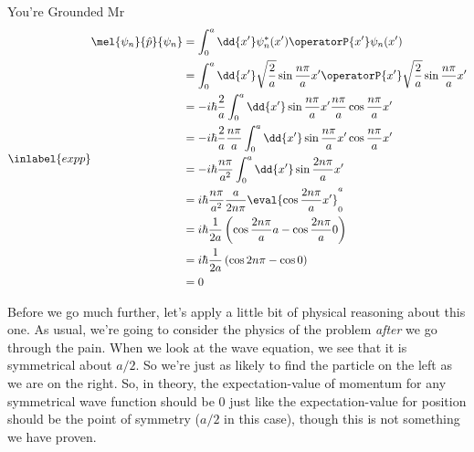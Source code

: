 \begin{answer}
\begin{answerpart}{You're Grounded Mr}
    \begin{equation}
      \inlabel{expp}
      \begin{split}
        \mel{\psi_n}{\hat{p}}{\psi_n}
        &=
        \int_0^a \dd{x'}
        \psi_{n}^{*}(x')
        \operatorP{x'}
        \psi_{n}(x')\\
        &=
        \int_0^a \dd{x'}
        \sqrt{\frac{2}{a}}\sin{\frac{n\pi}{a}x'}
        \operatorP{x'}
        \sqrt{\frac{2}{a}}\sin{\frac{n\pi}{a}x'}
        \\
        &=
        -i \hbar \frac{2}{a}
        \int_0^a \dd{x'}
        \sin{\frac{n\pi}{a}x'}
        \frac{n\pi}{a}
        \cos{\frac{n\pi}{a}x'}
        \\
        &=
        -i \hbar \frac{2}{a}
        \frac{n\pi}{a}
        \int_0^a \dd{x'}
        \sin{\frac{n\pi}{a}x'}
        \cos{\frac{n\pi}{a}x'}
        \\
        &=
        -i \hbar
        \frac{n\pi}{a^2}
        \int_0^a \dd{x'}
        \sin{\frac{2n\pi}{a}x'}
        \\
        &=
        i \hbar
        \frac{n\pi}{a^2}
        \frac{a}{2n\pi}
        \eval{
          \cos{\frac{2n\pi}{a}x'}
          }_0^a
        \\
        &=
        i \hbar
        \frac{1}{2a}
        \left(
        \cos{\frac{2n\pi}{a}a}
        -
        \cos{\frac{2n\pi}{a}0}
        \right)
        \\
        &=
        i \hbar
        \frac{1}{2a}
        \left(
        \cos{2n\pi}
        -
        \cos{0}
        \right)
        \\
        &= 0
        \\
      \end{split}
    \end{equation}

    Before we go much further, let's apply a little bit of physical
    reasoning about this one.  As usual, we're going to consider the
    physics of the problem \emph{after} we go through the pain.  When
    we look at the wave equation, we see that it is symmetrical about
    $a/2$.  So we're just as likely to find the particle on the left
    as we are on the right.  So, in theory, the expectation-value of
    momentum for any symmetrical wave function should be 0 just like
    the expectation-value for position should be the point of symmetry
    ($a/2$ in this case), though this is not something we have proven.


\end{answerpart}
\end{answer}
